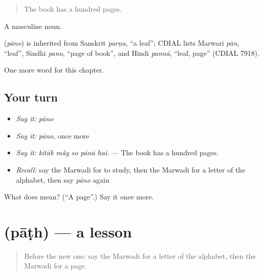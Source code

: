 \begin{quote}
The book has a hundred pages.
\end{quote}

A masculine noun.

\begin{cousinweb}
\textbf{} (\emph{pāno}) is inherited from Sanskrit \emph{parṇa}, \textquotedblleft{}a leaf\textquotedblright{}; CDIAL lists Marwari \emph{pān}, \textquotedblleft{}leaf\textquotedblright{}, Sindhi \emph{pano}, \textquotedblleft{}page of book\textquotedblright{}, and Hindi \emph{pannā}, \textquotedblleft{}leaf, page\textquotedblright{} (CDIAL 7918).
\end{cousinweb}

\begin{grammarlens}[title={What you've built}]
One more word for this chapter.
\end{grammarlens}

\subsection*{Your turn}
\begin{itemize}
\raggedright
  \item \emph{Say it:} \emph{pāno}
  \item \emph{Say it:} \emph{pāno}, once more
  \item \emph{Say it:} \emph{kitāb mā̃y so pānā hai.} — The book has a hundred pages.
  \item \emph{Recall:} say the Marwadi for to study, then the Marwadi for a letter of the alphabet, then say \emph{pāno} again
\end{itemize}

\begin{tcolorbox}[breakable,colback=teal!4,colframe=teal!35!black,title={Before you move on}]
What does  mean? (\textquotedblleft{}A page\textquotedblright{}.) Say it once more.
\end{tcolorbox}
\section[\texorpdfstring{\mw{पाठ} (pāṭh)}{पाठ (pāṭh)}]{ (pāṭh) — a lesson}

\label{lesson:MW-C285-path}



\begin{quote}
Before the new one: say the Marwadi for a letter of the alphabet, then the Marwadi for a page.
\end{quote}

